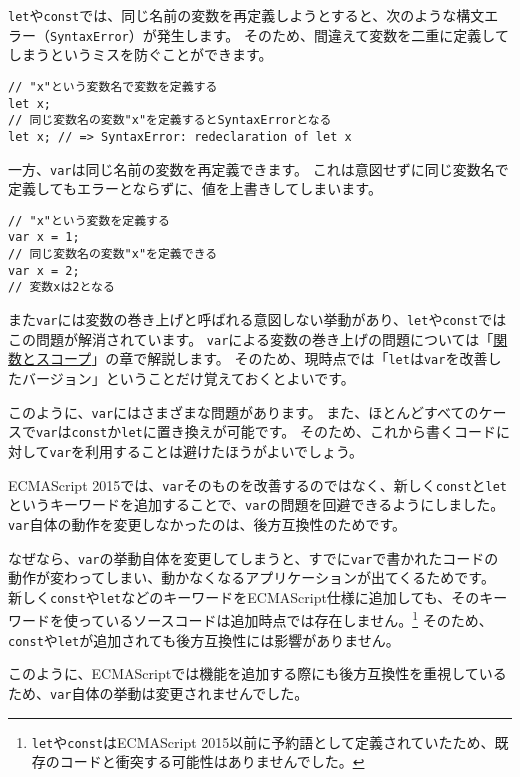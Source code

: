 \texttt{let}や\texttt{const}では、同じ名前の変数を再定義しようとすると、次のような構文エラー（\texttt{SyntaxError}）が発生します。
そのため、間違えて変数を二重に定義してしまうというミスを防ぐことができます。

\begin{lstlisting}
// "x"という変数名で変数を定義する
let x;
// 同じ変数名の変数"x"を定義するとSyntaxErrorとなる
let x; // => SyntaxError: redeclaration of let x
\end{lstlisting}

一方、\texttt{var}は同じ名前の変数を再定義できます。
これは意図せずに同じ変数名で定義してもエラーとならずに、値を上書きしてしまいます。

\begin{lstlisting}
// "x"という変数を定義する
var x = 1;
// 同じ変数名の変数"x"を定義できる
var x = 2;
// 変数xは2となる
\end{lstlisting}

また\texttt{var}には変数の巻き上げと呼ばれる意図しない挙動があり、\texttt{let}や\texttt{const}ではこの問題が解消されています。
\texttt{var}による変数の巻き上げの問題については「\href{../function-scope/README.md}{関数とスコープ}」の章で解説します。
そのため、現時点では「\texttt{let}は\texttt{var}を改善したバージョン」ということだけ覚えておくとよいです。

このように、\texttt{var}にはさまざまな問題があります。
また、ほとんどすべてのケースで\texttt{var}は\texttt{const}か\texttt{let}に置き換えが可能です。
そのため、これから書くコードに対して\texttt{var}を利用することは避けたほうがよいでしょう。

\begin{tcolorbox}[title=なぜ\texttt{let}や\texttt{const}は追加されたのか？]\label{why-add-let-and-const}

ECMAScript
2015では、\texttt{var}そのものを改善するのではなく、新しく\texttt{const}と\texttt{let}というキーワードを追加することで、\texttt{var}の問題を回避できるようにしました。\texttt{var}自体の動作を変更しなかったのは、後方互換性のためです。

なぜなら、\texttt{var}の挙動自体を変更してしまうと、すでに\texttt{var}で書かれたコードの動作が変わってしまい、動かなくなるアプリケーションが出てくるためです。
新しく\texttt{const}や\texttt{let}などのキーワードをECMAScript仕様に追加しても、そのキーワードを使っているソースコードは追加時点では存在しません。\footnote{\texttt{let}や\texttt{const}はECMAScript
  2015以前に予約語として定義されていたため、既存のコードと衝突する可能性はありませんでした。}
そのため、\texttt{const}や\texttt{let}が追加されても後方互換性には影響がありません。

このように、ECMAScriptでは機能を追加する際にも後方互換性を重視しているため、\texttt{var}自体の挙動は変更されませんでした。
\end{tcolorbox}

